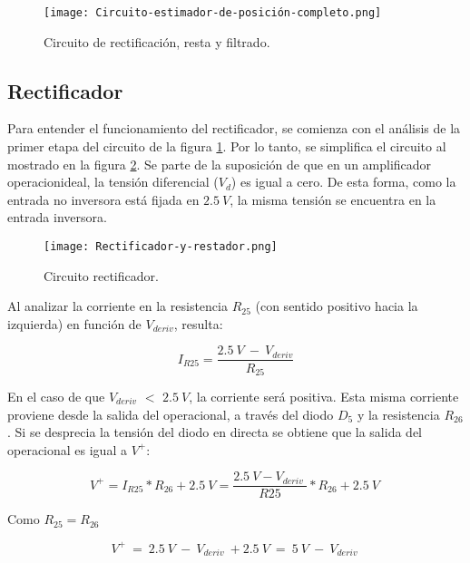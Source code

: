 \begin{figure}[H]
	\centering
	\texttt{[image: Circuito-estimador-de-posición-completo.png]}
	\caption{Circuito de rectificación, resta y filtrado.}
	\label{fig:img_Circuito_estimador_de_posición_completo}
\end{figure}

\subsection{Rectificador}

Para entender el funcionamiento del rectificador, se comienza con el análisis de la primer etapa del circuito de la figura \ref{fig:img_Circuito_estimador_de_posición_completo}. Por lo tanto, se simplifica el circuito al mostrado en la figura \ref{fig:img_Rectificador_y_restador}. Se parte de la suposición de que en un amplificador operacionideal, la tensión diferencial ($V_d$) es igual a cero. De esta forma, como la entrada no inversora está fijada en $2.5\:V$, la misma tensión se encuentra en la entrada inversora.


\begin{figure}[H]
	\centering
	\texttt{[image: Rectificador-y-restador.png]}
	\caption{Circuito rectificador.}
	\label{fig:img_Rectificador_y_restador}
\end{figure}

Al analizar la corriente en la resistencia $R_{25}$ (con sentido positivo hacia la izquierda) en función de $V_{deriv}$, resulta:

\begin{equation} \label{eq_corriente_r25}
	I_{R25}=\frac{2.5\:V\ -\ V_{deriv}}{R_{25}}
\end{equation}

En el caso de que $V_{deriv}$ $\mathrm{<}$ $2.5\:V$, la corriente será positiva. Esta misma corriente proviene desde la salida del operacional, a través del diodo $D_5$ y la resistencia $R_{26}$. Si se desprecia la tensión del diodo en directa se obtiene que la salida del operacional es igual a $V^+$:

\begin{equation} \label{eq_V+}
	V^+=I_{R25}*R_{26}+2.5\:V=\frac{2.5\:V-V_{deriv}\ }{R25}*R_{26}+2.5\:V\ 
\end{equation} 

Como $R_{25}=R_{26}$

\begin{equation} \label{eq_V+_2}
	V^+\ =\ 2.5\:V\ -\ V_{deriv}\ +2.5\:V\ =\ 5\:V\ -\ V_{deriv}\ 
\end{equation}

